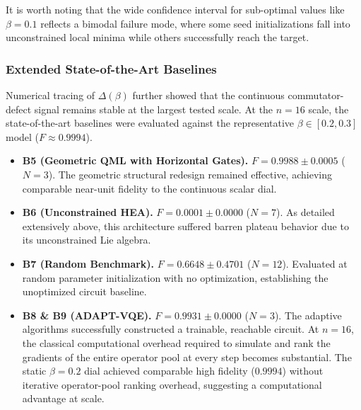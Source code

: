 \documentclass[10pt,twocolumn]{article}
\theoremstyle{remark}
\begin{document}

It is worth noting that the wide confidence interval for sub-optimal values like $\beta=0.1$ reflects a bimodal failure mode, where some seed initializations fall into unconstrained local minima while others successfully reach the target.

\subsubsection{Extended State-of-the-Art Baselines}
Numerical tracing of $\Delta(\beta)$ further showed that the continuous commutator-defect signal remains stable at the largest tested scale.
At the $n=16$ scale, the state-of-the-art baselines were evaluated against the representative $\beta \in [0.2, 0.3]$ model ($F \approx 0.9994$).
\begin{itemize}
    \item \textbf{B5 (Geometric QML with Horizontal Gates).} $F=0.9988 \pm 0.0005$ ($N=3$). The geometric structural redesign remained effective, achieving comparable near-unit fidelity to the continuous scalar dial.
    \item \textbf{B6 (Unconstrained HEA).} $F=0.0001 \pm 0.0000$ ($N=7$). As detailed extensively above, this architecture suffered barren plateau behavior due to its unconstrained Lie algebra.
    \item \textbf{B7 (Random Benchmark).} $F=0.6648 \pm 0.4701$ ($N=12$). Evaluated at random parameter initialization with no optimization, establishing the unoptimized circuit baseline.
    \item \textbf{B8 \& B9 (ADAPT-VQE).} $F=0.9931 \pm 0.0000$ ($N=3$). The adaptive algorithms successfully constructed a trainable, reachable circuit. At $n=16$, the classical computational overhead required to simulate and rank the gradients of the entire operator pool at every step becomes substantial. The static $\beta=0.2$ dial achieved comparable high fidelity ($0.9994$) without iterative operator-pool ranking overhead, suggesting a computational advantage at scale.
\end{itemize}
\end{document}
